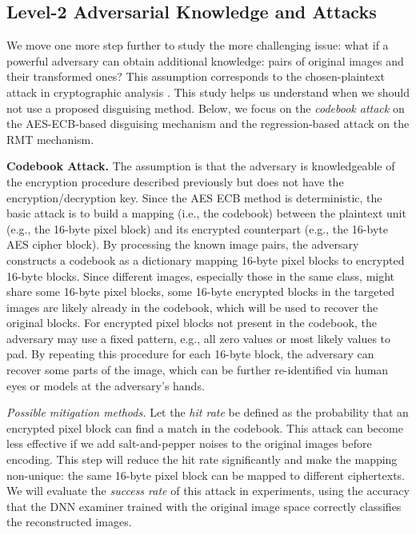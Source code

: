 \documentclass[conference]{IEEEtran}
\begin{document}
\subsection{Level-2 Adversarial Knowledge and Attacks} 
We move one more step further to study the more challenging issue: what if a powerful adversary can obtain additional knowledge: pairs of original images and their transformed ones? This assumption corresponds to the chosen-plaintext attack in cryptographic analysis \cite{katz07}. This study helps us understand when we should not use a proposed disguising method. Below, we focus on the \emph{codebook attack} on the AES-ECB-based disguising mechanism and the regression-based attack on the RMT mechanism.  

\textbf{Codebook Attack.} The assumption is that the adversary is knowledgeable of the encryption procedure described previously but does not have the encryption/decryption key. Since the AES ECB method is deterministic, the basic attack is to build a mapping (i.e., the codebook) between the plaintext unit (e.g., the 16-byte pixel block) and its encrypted counterpart (e.g., the 16-byte AES cipher block). By processing the known image pairs, the adversary constructs a codebook as a dictionary mapping 16-byte pixel blocks to encrypted 16-byte blocks. Since different images, especially those in the same class, might share some 16-byte pixel blocks, some 16-byte encrypted blocks in the targeted images are likely already in the codebook, which will be used to recover the original blocks. For encrypted pixel blocks not present in the codebook, the adversary may use a fixed pattern, e.g., all zero values or most likely values to pad. By repeating this procedure for each 16-byte block, the adversary can recover some parts of the image, which can be further re-identified via human eyes or models at the adversary's hands.

\emph{Possible mitigation methods.} Let the \emph{hit rate} be defined as the probability that an encrypted pixel block can find a match in the codebook. 
This attack can become less effective if we add salt-and-pepper noises to the original images before encoding. This step will reduce the hit rate significantly and make the mapping non-unique: the same 16-byte pixel block can be mapped to different ciphertexts. We will evaluate the \emph{success rate} of this attack in experiments, using the accuracy that the DNN examiner trained with the original image space correctly classifies the reconstructed images. 
\end{document}
